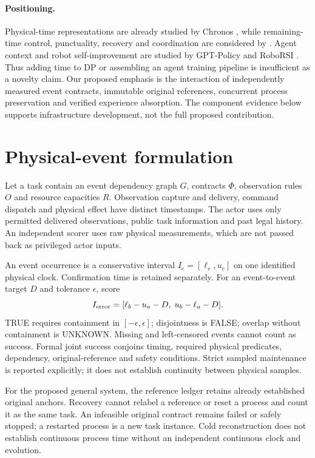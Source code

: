 \documentclass{article}
\begin{document}
\paragraph{Positioning.}
Physical-time representations are already studied by Chronos
\cite{chronos}, while remaining-time control, punctuality, recovery and
coordination are considered by \citet{timecontrol}. Agent context and robot
self-improvement are studied by GPT-Policy and RoboRSI
\cite{gptpolicy,roborsi}. Thus adding time to DP or assembling an agent training
pipeline is insufficient as a novelty claim. Our proposed emphasis is the
interaction of independently measured event contracts, immutable original
references, concurrent process preservation and verified experience absorption.
The component evidence below supports infrastructure development, not the
full proposed contribution.

\section{Physical-event formulation}
Let a task contain an event dependency graph $G$, contracts $\Phi$, observation
rules $O$ and resource capacities $R$. Observation capture and delivery,
command dispatch and physical effect have distinct timestamps. The actor
uses only permitted delivered observations, public task information and past
legal history. An independent scorer uses raw physical measurements, which
are not passed back as privileged actor inputs.

An event occurrence is a conservative interval $I_e=[\ell_e,u_e]$ on one
identified physical clock. Confirmation time is retained separately. For an
event-to-event target $D$ and tolerance $\epsilon$, score
\[ I_{\rm error}=[\ell_b-u_a-D,\;u_b-\ell_a-D]. \]
TRUE requires containment in $[-\epsilon,\epsilon]$; disjointness is FALSE;
overlap without containment is UNKNOWN. Missing and left-censored events
cannot count as success. Formal joint success conjoins timing, required
physical predicates, dependency, original-reference and safety conditions.
Strict sampled maintenance is reported explicitly; it does not establish
continuity between physical samples.

For the proposed general system, the reference ledger retains already established original anchors. Recovery
cannot relabel a reference or reset a process and count it as the same task.
An infeasible original contract remains failed or safely stopped; a restarted
process is a new task instance. Cold reconstruction does not establish
continuous process time without an independent continuous clock and evolution.
\end{document}
